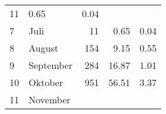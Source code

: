 \begin{longtable}{lXrrr}
       \num{11} &
       \num[round-mode=places,round-precision=2]{0.65} &
         \num[round-mode=places,round-precision=2]{0.04} \\

     7 &
     \multicolumn{1}{X}{ Juli   } &


       \num{11} &
       \num[round-mode=places,round-precision=2]{0.65} &
         \num[round-mode=places,round-precision=2]{0.04} \\

     8 &
     \multicolumn{1}{X}{ August   } &


       \num{154} &
       \num[round-mode=places,round-precision=2]{9.15} &
         \num[round-mode=places,round-precision=2]{0.55} \\

     9 &
     \multicolumn{1}{X}{ September   } &


       \num{284} &
       \num[round-mode=places,round-precision=2]{16.87} &
         \num[round-mode=places,round-precision=2]{1.01} \\

     10 &
     \multicolumn{1}{X}{ Oktober   } &


       \num{951} &
       \num[round-mode=places,round-precision=2]{56.51} &
         \num[round-mode=places,round-precision=2]{3.37} \\

     11 &
     \multicolumn{1}{X}{ November   } &



\end{longtable}
